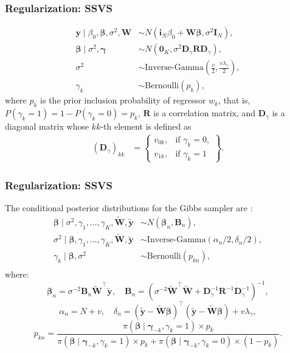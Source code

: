 \documentclass[12pt, compress]{beamer}
\begin{document}
\begin{frame}
	\frametitle{Regularization: SSVS}
\begin{align*}
	\mathbf{y} \mid \beta_0, \boldsymbol{\beta}, \sigma^2, \mathbf{W} &\sim {N}(\mathbf{i}_N \beta_0  + \mathbf{W} \boldsymbol{\beta}, \sigma^2 \mathbf{I}_N), \\
	\boldsymbol{\beta} \mid \sigma^2, \boldsymbol{\gamma} &\sim {N}(\mathbf{0}_K, \sigma^2 \mathbf{D}_{\gamma} \mathbf{R} \mathbf{D}_{\gamma}), \\
	\sigma^2 &\sim \text{Inverse-Gamma}\left(\frac{v}{2}, \frac{v\lambda_{\gamma}}{2}\right), \\
	\gamma_k &\sim \text{Bernoulli}(p_k),
\end{align*}
where \(p_k\) is the prior inclusion probability of regressor \(w_k\), that is, \(P(\gamma_k = 1) = 1 - P(\gamma_k = 0) = p_k\), \(\mathbf{R}\) is a correlation matrix, and \(\mathbf{D}_{\gamma}\) is a diagonal matrix whose \(kk\)-th element is defined as
\begin{align*}
	(\mathbf{D}_{\gamma})_{kk} &= 
	\begin{Bmatrix}
		v_{0k}, & \text{if } \gamma_k = 0, \\
		v_{1k}, & \text{if } \gamma_k = 1
	\end{Bmatrix}.
\end{align*}
\end{frame}

\begin{frame}
	\frametitle{Regularization: SSVS}
The conditional posterior distributions for the Gibbs sampler are \citep{george1993variable}:
\begin{align*}
	\boldsymbol{\beta} \mid \sigma^2, \gamma_1, \dots, \gamma_K, \tilde{\mathbf{W}}, \tilde{\mathbf{y}} &\sim {N}(\boldsymbol{\beta}_n, \mathbf{B}_n), \\
	\sigma^2 \mid \boldsymbol{\beta}, \gamma_1, \dots, \gamma_K, \tilde{\mathbf{W}}, \tilde{\mathbf{y}} &\sim \text{Inverse-Gamma}(\alpha_n/2, \delta_n/2), \\
	\gamma_k \mid \boldsymbol{\beta}, \sigma^2 &\sim \text{Bernoulli}(p_{kn}),\\
\end{align*}
where:
\[\boldsymbol{\beta}_n = \sigma^{-2} \mathbf{B}_n \tilde{\mathbf{W}}^{\top} \tilde{\mathbf{y}}, \quad
	\mathbf{B}_n = \left(\sigma^{-2} \tilde{\mathbf{W}}^{\top} \tilde{\mathbf{W}} + \mathbf{D}_{\gamma}^{-1}\mathbf{R}^{-1}\mathbf{D}_{\gamma}^{-1} \right)^{-1},
\]
\[\alpha_n = N + v, \quad	\delta_n = (\tilde{\mathbf{y}} - \tilde{\mathbf{W}} \boldsymbol{\beta})^{\top} (\tilde{\mathbf{y}} - \tilde{\mathbf{W}} \boldsymbol{\beta}) + v\lambda_{\gamma},
\]
\[p_{kn} = \frac{\pi(\boldsymbol{\beta}\mid \boldsymbol{\gamma}_{-k},\gamma_k=1)\times p_k}{\pi(\boldsymbol{\beta}\mid \boldsymbol{\gamma}_{-k},\gamma_k=1)\times p_k+\pi(\boldsymbol{\beta}\mid \boldsymbol{\gamma}_{-k},\gamma_k=0)\times (1-p_k)}.
\]
\end{frame}
\end{document}
